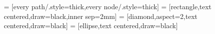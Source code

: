 


\usetikzlibrary{er}



 = [every path/.style={thick},every node/.style={thick}]
 = [rectangle,text centered,draw=black,inner sep=2mm]
 = [diamond,aspect=2,text centered,draw=black]
 = [ellipse,text centered,draw=black]
\newcommand{\primarykey}[1]{\underline{#1}}
\newcommand{\foreignkey}[1]{\ifmodulgeladen{icons}{\faLongArrowAltUp}{\uparrow}\,#1}
